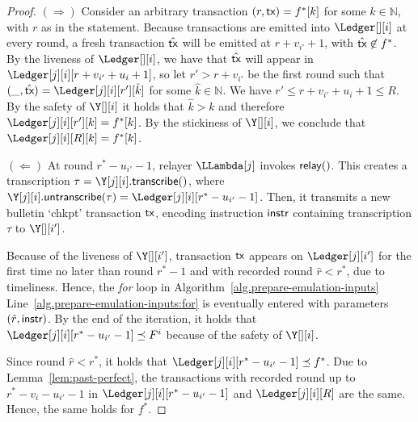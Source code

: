 \begin{proof}
  \noindent
  \textbf{$(\Longrightarrow)$} Consider an arbitrary transaction $(r, \textsf{tx}) = f^*[k]$
  for some $k \in \mathbb{N}$, with $r$ as in the statement.
  Because transactions are emitted into $\Ledger[][i]$
  at every round, a fresh transaction $\hat{\textsf{tx}}$ will be emitted at $r + v_{i'} + 1$,
  with $\hat{\textsf{tx}} \not\in f^*$.
  By the liveness of $\Ledger[][i]$, we have that $\hat{\textsf{tx}}$ will appear in
  $\Ledger[j][i][r + v_{i'} + u_i + 1]$, so let $r' > r + v_{i'}$ be the first round such that
  $(\_, \hat{\tx}) = \Ledger[j][i][r'][\hat{k}]$
  for some $\hat{k} \in \mathbb{N}$.
  We have $r' \leq r + v_{i'} + u_i + 1 \leq R$.
  By the safety of $\Y[][i]$ it holds that $\hat{k} > k$
  and therefore $\Ledger[j][i][r'][k] = f^*[k]$.
  By the stickiness of $\Y[][i]$, we conclude that
  $\Ledger[j][i][R][k] = f^*[k]$.

  \noindent
  \textbf{$(\Longleftarrow)$}
  At round $r^* - u_{i'} - 1$, relayer $\LLambda[j]$ invokes $\textsf{relay}()$.
  This creates a transcription $\tau = \Y[j][i].\transcribe()$, where
  $\Y[j][i].\untranscribe(\tau) = \Ledger[j][i][r^* - u_{i'} - 1]$.
  Then, it transmits a new bulletin `chkpt' transaction $\textsf{tx}$,
  encoding instruction $\textsf{instr}$ containing transcription $\tau$ to $\Y[][i']$.

  Because of the liveness of $\Y[][i']$, transaction $\textsf{tx}$ appears on $\Ledger[j][i']$ for the
  first time no later than round $r^* - 1$ and with recorded round $\hat{r} < r^*$, due to timeliness.
  Hence, the \emph{for} loop in Algorithm~\ref{alg.prepare-emulation-inputs}
  Line~\ref{alg.prepare-emulation-inputs:for} is eventually entered with
  parameters $(\hat{r}, \textsf{instr})$. By the end of the iteration, it holds that
  $\Ledger[j][i][r^* - u_{i'} - 1] \preceq F^i$ because of the safety of $\Y[][i]$.

  Since round $\hat{r} < r^*$, it holds that $\Ledger[j][i][r^* - u_{i'} - 1] \preceq f^*$.
  Due to Lemma~\ref{lem:past-perfect}, the transactions
  with recorded round up to $r^* - v_i - u_{i'} - 1$ in $\Ledger[j][i][r^* - u_{i'} - 1]$
  and $\Ledger[j][i][R]$ are the same.
  Hence, the same holds for $f^*$.\Qed
\end{proof}

